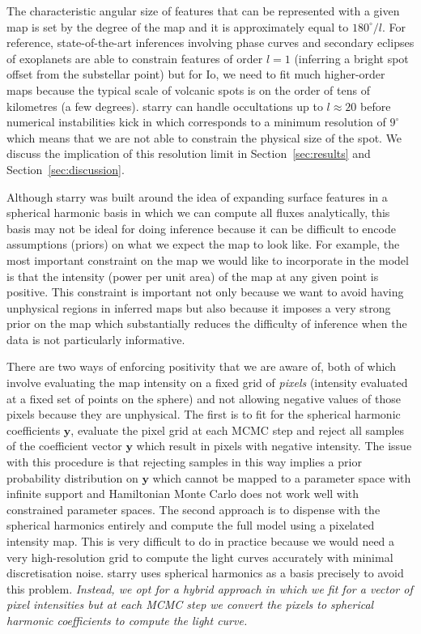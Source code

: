 \documentclass[12pt,dvipsnames]{report}
\begin{document}
The characteristic angular size of features that can be represented with a given map 
is set by the degree of the map and it is approximately equal to $180^\circ/l$.
For reference, state-of-the-art inferences involving phase curves and secondary eclipses of exoplanets are able to constrain features of order $l=1$ (inferring a bright spot offset from the substellar point) but for Io, we need to fit much higher-order maps because the typical scale of volcanic spots is on the order of tens of kilometres (a few degrees).
\textsf{starry} can handle occultations up to $l\approx 20$ before numerical 
instabilities kick in \citep{2019AJ....157...64L} which corresponds to a minimum 
resolution of $9^\circ$ which means that we are not able to constrain the physical 
size of the spot.
We discuss the implication of this resolution limit in Section~\ref{sec:results} and Section~\ref{sec:discussion}.

Although \textsf{starry} was built around the idea of expanding surface features in a spherical harmonic basis in which we can compute all fluxes analytically, this basis may not be ideal for doing inference because it can be difficult to encode assumptions (priors) on what we expect the map to look like.
For example, the most important constraint on the map we would like to incorporate in the model is that the intensity (power per unit area) of the map at any given point is positive. 
This constraint is important not only because we want to avoid having unphysical regions in inferred maps but also because it imposes a very strong prior on the map which substantially reduces the difficulty of inference when the data is not particularly informative.

There are two ways of enforcing positivity that we are aware of, both of which involve evaluating the map intensity on a fixed grid of \emph{pixels} (intensity evaluated at a fixed set of points on the sphere) and not allowing negative values of those pixels because they are unphysical.
The first is to fit for the spherical harmonic coefficients $\mathbf{y}$, evaluate the pixel grid at each MCMC step and reject all samples of the coefficient vector $\mathbf{y}$ which result in pixels with negative intensity.
The issue with this procedure is that rejecting samples in this way implies a prior probability distribution on $\mathbf{y}$ which cannot be mapped to a parameter space with infinite support and Hamiltonian Monte Carlo does not work well with constrained parameter spaces.
The second approach is to dispense with the spherical harmonics entirely and compute the full model using a pixelated intensity map.
This is very difficult to do in practice because we would need a very high-resolution grid to compute the light curves accurately with minimal discretisation noise.  
\textsf{starry} uses spherical harmonics as a basis precisely to avoid this problem.
\emph{Instead, we opt for a hybrid approach in which we fit for a vector of pixel intensities but at each MCMC step we convert the pixels to spherical harmonic coefficients to compute the light curve.}
\end{document}
